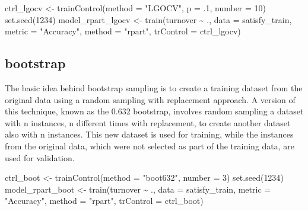 \documentclass[
]{book}
\newenvironment{Shaded}{\begin{snugshade}}{\end{snugshade}}
\newcommand{\AttributeTok}[1]{\textcolor[rgb]{0.77,0.63,0.00}{#1}}
\newcommand{\DecValTok}[1]{\textcolor[rgb]{0.00,0.00,0.81}{#1}}
\newcommand{\FunctionTok}[1]{\textcolor[rgb]{0.00,0.00,0.00}{#1}}
\newcommand{\NormalTok}[1]{#1}
\newcommand{\OtherTok}[1]{\textcolor[rgb]{0.56,0.35,0.01}{#1}}
\newcommand{\SpecialCharTok}[1]{\textcolor[rgb]{0.00,0.00,0.00}{#1}}
\newcommand{\StringTok}[1]{\textcolor[rgb]{0.31,0.60,0.02}{#1}}
\begin{document}
\begin{Shaded}
\begin{Highlighting}[]
\NormalTok{ctrl\_lgocv }\OtherTok{\textless{}{-}} \FunctionTok{trainControl}\NormalTok{(}\AttributeTok{method =} \StringTok{"LGOCV"}\NormalTok{, }\AttributeTok{p =}\NormalTok{ .}\DecValTok{1}\NormalTok{, }\AttributeTok{number =} \DecValTok{10}\NormalTok{)}
\FunctionTok{set.seed}\NormalTok{(}\DecValTok{1234}\NormalTok{)}
\NormalTok{model\_rpart\_lgocv }\OtherTok{\textless{}{-}} \FunctionTok{train}\NormalTok{(turnover }\SpecialCharTok{\textasciitilde{}}\NormalTok{ .,}
                           \AttributeTok{data =}\NormalTok{ satisfy\_train,}
                           \AttributeTok{metric =} \StringTok{"Accuracy"}\NormalTok{,}
                           \AttributeTok{method =} \StringTok{"rpart"}\NormalTok{,}
                           \AttributeTok{trControl =}\NormalTok{ ctrl\_lgocv)}
\end{Highlighting}
\end{Shaded}

\hypertarget{bootstrap-1}{%
\subsection{bootstrap}\label{bootstrap-1}}

The basic idea behind bootstrap sampling is to create a training dataset from
the original data using a random sampling with replacement approach. A version of this technique, known as the 0.632 bootstrap, involves random sampling a dataset with n instances, n different times with replacement, to create another dataset also with n instances. This new dataset is used for training, while the instances from the original data, which were not selected as part of the training data, are used for validation.

\begin{Shaded}
\begin{Highlighting}[]
\NormalTok{ctrl\_boot }\OtherTok{\textless{}{-}} \FunctionTok{trainControl}\NormalTok{(}\AttributeTok{method =} \StringTok{"boot632"}\NormalTok{, }\AttributeTok{number =} \DecValTok{3}\NormalTok{)}
\FunctionTok{set.seed}\NormalTok{(}\DecValTok{1234}\NormalTok{)}
\NormalTok{model\_rpart\_boot }\OtherTok{\textless{}{-}} \FunctionTok{train}\NormalTok{(turnover }\SpecialCharTok{\textasciitilde{}}\NormalTok{ .,}
                           \AttributeTok{data =}\NormalTok{ satisfy\_train,}
                           \AttributeTok{metric =} \StringTok{"Accuracy"}\NormalTok{,}
                           \AttributeTok{method =} \StringTok{"rpart"}\NormalTok{,}
                           \AttributeTok{trControl =}\NormalTok{ ctrl\_boot)}
\end{Highlighting}
\end{Shaded}
\end{document}
